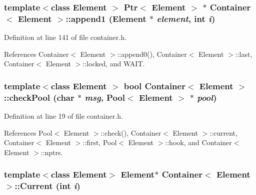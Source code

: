 \hypertarget{classContainer_9a010e8a15cd0076bb27b1627de1aebd}{
\subsubsection[{append1}]{\setlength{\rightskip}{0pt plus 5cm}template$<$class Element $>$ {\bf Ptr}$<$ Element $>$ $\ast$ {\bf Container}$<$ Element $>$::append1 (Element $\ast$ {\em element}, \/  int {\em i})}}
\label{classContainer_9a010e8a15cd0076bb27b1627de1aebd}




Definition at line 141 of file container.h.

References Container$<$ Element $>$::append0(), Container$<$ Element $>$::last, Container$<$ Element $>$::locked, and WAIT.\hypertarget{classContainer_1509fb216b609a2b938cc42fe25502ec}{
\subsubsection[{checkPool}]{\setlength{\rightskip}{0pt plus 5cm}template$<$class Element $>$ bool {\bf Container}$<$ Element $>$::checkPool (char $\ast$ {\em msg}, \/  {\bf Pool}$<$ Element $>$ $\ast$ {\em pool})}}
\label{classContainer_1509fb216b609a2b938cc42fe25502ec}




Definition at line 19 of file container.h.

References Pool$<$ Element $>$::check(), Container$<$ Element $>$::current, Container$<$ Element $>$::first, Pool$<$ Element $>$::hook, and Container$<$ Element $>$::nptrs.\hypertarget{classContainer_fbd992e0044ce433a8acd6015a9d876c}{
\subsubsection[{Current}]{\setlength{\rightskip}{0pt plus 5cm}template$<$class Element$>$ Element$\ast$ {\bf Container}$<$ Element $>$::Current (int {\em i})}}
\label{classContainer_fbd992e0044ce433a8acd6015a9d876c}




